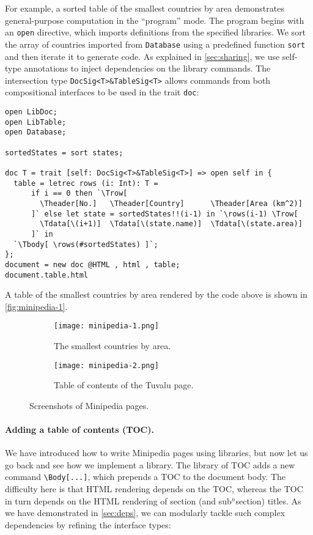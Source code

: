 For example, a sorted table of the smallest countries by area demonstrates
general-purpose computation in the ``program'' mode. The program begins with an
\lstinline{open} directive, which imports definitions from the specified
libraries. We sort the array of countries imported from \lstinline{Database}
using a predefined function \lstinline{sort} and then iterate it to generate
\ExT code. As explained in \autoref{sec:sharing}, we use self-type annotations
to inject dependencies on the library commands. The intersection type
\lstinline{DocSig<T>&TableSig<T>} allows \ExT commands from both compositional
interfaces to be used in the trait \lstinline{doc}:

\begin{lstlisting}
open LibDoc;
open LibTable;
open Database;

sortedStates = sort states;

doc T = trait [self: DocSig<T>&TableSig<T>] => open self in {
  table = letrec rows (i: Int): T =
      if i == 0 then `\Trow[
        \Theader[No.]   \Theader[Country]      \Theader[Area (km^2)]
      ]` else let state = sortedStates!!(i-1) in `\rows(i-1) \Trow[
        \Tdata[\(i+1)]  \Tdata[\(state.name)]  \Tdata[\(state.area)]
      ]` in
  `\Tbody[ \rows(#sortedStates) ]`;
};
document = new doc @HTML , html , table;
document.table.html
\end{lstlisting}

\noindent
A table of the smallest countries by area rendered by the code above is shown in
\autoref{fig:minipedia-1}.

\begin{figure}
\begin{subfigure}{.5\textwidth}
\centering
\texttt{[image: minipedia-1.png]}
\caption{The smallest countries by area.}
\label{fig:minipedia-1}
\end{subfigure}%
\begin{subfigure}{.5\textwidth}
\centering
\texttt{[image: minipedia-2.png]}
\caption{Table of contents of the Tuvalu page.}
\label{fig:minipedia-2}
\end{subfigure}
\caption{Screenshots of Minipedia pages.}
\end{figure}

\paragraph{Adding a table of contents (TOC).}
We have introduced how to write Minipedia pages using \ExT libraries, but now
let us go back and see how we implement a \ExT library. The library of TOC adds
a new command \lstinline{\Body[...]}, which prepends a TOC to the document body.
The difficulty here is that HTML rendering depends on the TOC, whereas the TOC
in turn depends on the HTML rendering of section (and sub$^n$section) titles. As
we have demonstrated in \autoref{sec:deps}, we can modularly tackle such complex
dependencies by refining the interface types:

